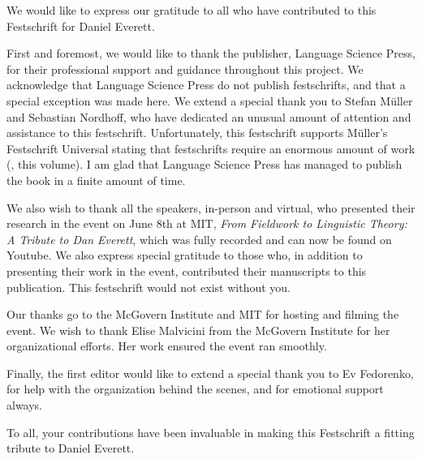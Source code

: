 \addchap{\lsAcknowledgementTitle} 

\begin{refsection}

We would like to express our gratitude to all who have contributed to this Festschrift for Daniel Everett. 

First and foremost, we would like to thank the publisher, Language Science Press, for their professional support and guidance throughout this project. We acknowledge that Language Science Press do not publish festschrifts, and that a special exception was made here. We extend a special thank you to Stefan Müller and Sebastian Nordhoff, who have dedicated an unusual amount of attention and assistance to this festschrift. Unfortunately, this festschrift supports Müller's Festschrift Universal stating that festschrifts require an enormous amount of work (\citealt[xvi]{chapters/0_mueller}, this volume). I am glad that Language Science Press has managed to publish the book in a finite amount of time.

We also wish to thank all the speakers, in-person and virtual, who presented their research in the event on June 8th at MIT, \textit{From Fieldwork to Linguistic Theory: A Tribute to Dan Everett}, which was fully recorded and can now be found on Youtube. We also express special gratitude to those who, in addition to presenting their work in the event, contributed their manuscripts to this publication. This festschrift would not exist without you. 

Our thanks go to the McGovern Institute and MIT for hosting and filming the event. We wish to thank Elise Malvicini from the McGovern Institute for her organizational efforts. Her work ensured the event ran smoothly. 

Finally, the first editor would like to extend a special thank you to Ev Fedorenko, for help with the organization behind the scenes, and for emotional support always.

To all, your contributions have been invaluable in making this Festschrift a fitting tribute to Daniel Everett.

\printbibliography[heading=subbibliography,notkeyword=this]

\end{refsection}